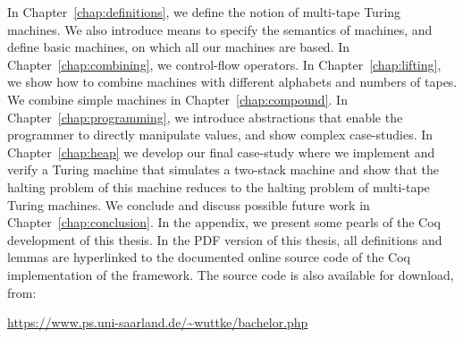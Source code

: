 In Chapter~\ref{chap:definitions}, we define the notion of multi-tape Turing machines.  We also introduce means to specify the semantics of machines,
and define basic machines, on which all our machines are based.  In Chapter~\ref{chap:combining}, we control-flow operators.  In
Chapter~\ref{chap:lifting}, we show how to combine machines with different alphabets and numbers of tapes.  We combine simple machines in
Chapter~\ref{chap:compound}.  In Chapter~\ref{chap:programming}, we introduce abstractions that enable the programmer to directly manipulate values,
and show complex case-studies.  In Chapter~\ref{chap:heap} we develop our final case-study where we implement and verify a Turing machine that
simulates a two-stack machine and show that the halting problem of this machine reduces to the halting problem of multi-tape Turing machines.  We
conclude and discuss possible future work in Chapter~\ref{chap:conclusion}.  In the appendix, we present some pearls of the Coq development of this
thesis.  In the PDF version of this thesis, all definitions and lemmas are hyperlinked to the documented online source code of the Coq implementation
of the framework.  The source code is also available for download, from:

\begin{center}
  \url{https://www.ps.uni-saarland.de/~wuttke/bachelor.php}
\end{center}


